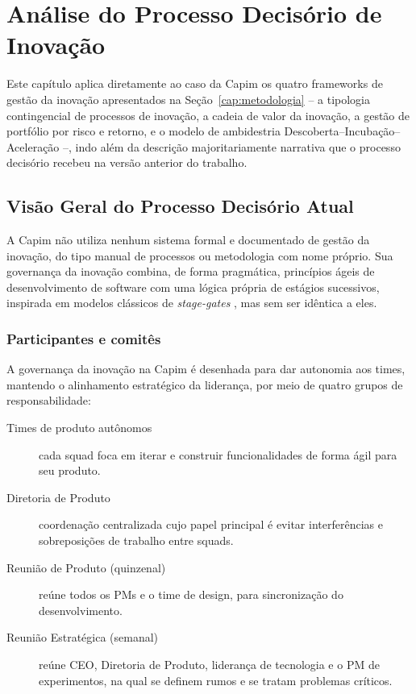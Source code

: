 
\chapter{Análise do Processo Decisório de Inovação}
\label{cap:processo-decisorio}

Este capítulo aplica diretamente ao caso da Capim os quatro frameworks de gestão da inovação apresentados na Seção~\ref{cap:metodologia} -- a tipologia contingencial de processos de inovação, a cadeia de valor da inovação, a gestão de portfólio por risco e retorno, e o modelo de ambidestria Descoberta--Incubação--Aceleração --, indo além da descrição majoritariamente narrativa que o processo decisório recebeu na versão anterior do trabalho.

\section{Visão Geral do Processo Decisório Atual}

A Capim não utiliza nenhum sistema formal e documentado de gestão da inovação, do tipo manual de processos ou metodologia com nome próprio. Sua governança da inovação combina, de forma pragmática, princípios ágeis de desenvolvimento de software com uma lógica própria de estágios sucessivos, inspirada em modelos clássicos de \textit{stage-gates} \cite{cooper1990}, mas sem ser idêntica a eles.

\subsection{Participantes e comitês}

A governança da inovação na Capim é desenhada para dar autonomia aos times, mantendo o alinhamento estratégico da liderança, por meio de quatro grupos de responsabilidade:

\begin{description}
  \item[Times de produto autônomos] cada squad foca em iterar e construir funcionalidades de forma ágil para seu produto.
  \item[Diretoria de Produto] coordenação centralizada cujo papel principal é evitar interferências e sobreposições de trabalho entre squads.
  \item[Reunião de Produto (quinzenal)] reúne todos os PMs e o time de design, para sincronização do desenvolvimento.
  \item[Reunião Estratégica (semanal)] reúne CEO, Diretoria de Produto, liderança de tecnologia e o PM de experimentos, na qual se definem rumos e se tratam problemas críticos.
\end{description}

